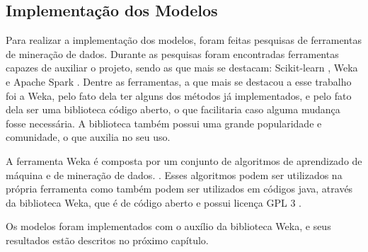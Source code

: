 \subsection{Implementação dos Modelos}

Para realizar a implementação dos modelos, foram feitas pesquisas de ferramentas de mineração de dados. Durante as pesquisas foram encontradas ferramentas capazes de auxiliar o projeto, sendo as que mais se destacam: Scikit-learn \cite{scikit}, Weka \cite{weka_2005} e Apache Spark \cite{spark}. Dentre as ferramentas, a que mais se destacou a esse trabalho foi a Weka, pelo fato dela ter alguns dos métodos já implementados, e pelo fato dela ser uma biblioteca código aberto, o que facilitaria caso alguma mudança fosse necessária. A biblioteca também possui uma grande popularidade e comunidade, o que auxilia no seu uso.

A ferramenta Weka é composta por um conjunto de algoritmos de aprendizado de máquina e de mineração de dados. \cite{weka_2005}. Esses algoritmos podem ser utilizados na própria ferramenta como também podem ser utilizados em códigos java, através da biblioteca Weka, que é de código aberto e possui licença GPL 3 \cite{gpl_2007}.

Os modelos foram implementados com o auxílio da biblioteca Weka, e seus resultados estão descritos no próximo capítulo.

